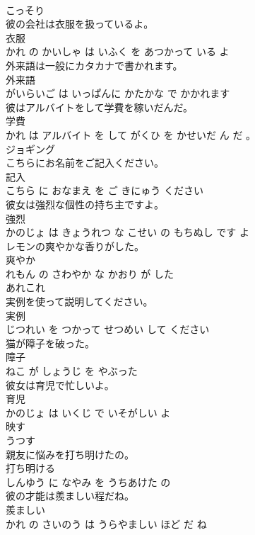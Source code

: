 \documentclass[8pt]{extreport}
\begin{document}
\begin{CJK}{UTF8}{min}
\\	こっそり	
\\	彼の会社は衣服を扱っているよ。	
\\	衣服 
\\	かれ の かいしゃ は いふく を あつかって いる よ			
\\	外来語は一般にカタカナで書かれます。	
\\	外来語 
\\	がいらいご は いっぱんに かたかな で かかれます			
\\	彼はアルバイトをして学費を稼いだんだ。	
\\	学費 
\\	かれ は アルバイト を して がくひ を かせいだ ん だ 。			
\\	ジョギング	
\\	こちらにお名前をご記入ください。	
\\	記入 
\\	こちら に おなまえ を ご きにゅう ください			
\\	彼女は強烈な個性の持ち主ですよ。	
\\	強烈 
\\	かのじょ は きょうれつ な こせい の もちぬし です よ			
\\	レモンの爽やかな香りがした。	
\\	爽やか 
\\	れもん の さわやか な かおり が した			
\\	あれこれ	
\\	実例を使って説明してください。	
\\	実例 
\\	じつれい を つかって せつめい して ください			
\\	猫が障子を破った。	
\\	障子 
\\	ねこ が しょうじ を やぶった			
\\	彼女は育児で忙しいよ。	
\\	育児 
\\	かのじょ は いくじ で いそがしい よ			
\\	映す	
\\	うつす			
\\	親友に悩みを打ち明けたの。	
\\	打ち明ける 
\\	しんゆう に なやみ を うちあけた の			
\\	彼の才能は羨ましい程だね。	
\\	羨ましい 
\\	かれ の さいのう は うらやましい ほど だ ね			

\end{CJK}
\end{document}
